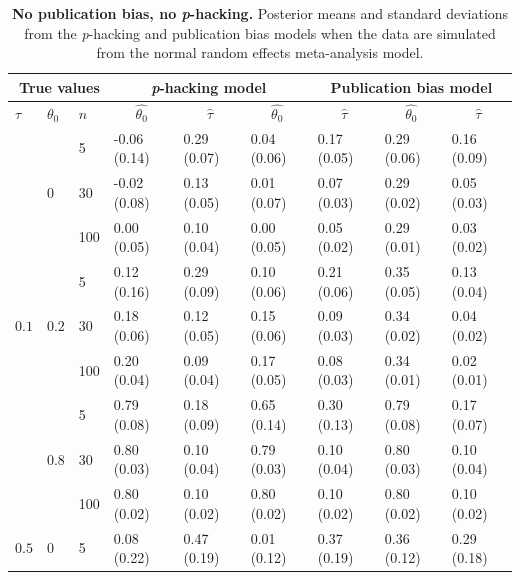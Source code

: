 \documentclass{article}
\theoremstyle{plain}
\theoremstyle{definition}
\begin{document}
\begin{table}[ht]
\centering
\caption{{\bf No publication bias, no \textit{p}-hacking.} Posterior means and standard deviations from the \textit{p}-hacking and publication bias models when the data are simulated from the normal random effects meta-analysis model.} 
\label{tab:Simulation_classical}
\begin{tabular}{lllllllll}
  \hline
  \multicolumn{3}{r}{\textbf{True values}} & 
       \multicolumn{3}{c}{\textbf{\textit{p}-hacking model}} &
       \multicolumn{3}{c}{\textbf{Publication bias model}} \\ \hline
$\tau$ & $\theta_0$ & $n$ & \multicolumn{1}{c}{$\widehat{\theta_0}$} & \multicolumn{1}{c}{$\widehat{\tau}$} & \multicolumn{1}{c}{$\widehat{\theta_0}$} & \multicolumn{1}{c}{$\widehat{\tau}$} & \multicolumn{1}{c}{$\widehat{\theta_0}$} & \multicolumn{1}{c}{$\widehat{\tau}$} \\ 
  \multirow{9}{*}{$0.1$} & \multirow{3}{*}{$0$} & 5 & -0.06 (0.14) & 0.29 (0.07) & 0.04 (0.06) & 0.17 (0.05) & 0.29 (0.06) & 0.16 (0.09) \\ 
   &  & 30 & -0.02 (0.08) & 0.13 (0.05) & 0.01 (0.07) & 0.07 (0.03) & 0.29 (0.02) & 0.05 (0.03) \\ 
   &  & 100 & 0.00 (0.05) & 0.10 (0.04) & 0.00 (0.05) & 0.05 (0.02) & 0.29 (0.01) & 0.03 (0.02) \\ 
   & \multirow{3}{*}{$0.2$} & 5 & 0.12 (0.16) & 0.29 (0.09) & 0.10 (0.06) & 0.21 (0.06) & 0.35 (0.05) & 0.13 (0.04) \\ 
   &  & 30 & 0.18 (0.06) & 0.12 (0.05) & 0.15 (0.06) & 0.09 (0.03) & 0.34 (0.02) & 0.04 (0.02) \\ 
   &  & 100 & 0.20 (0.04) & 0.09 (0.04) & 0.17 (0.05) & 0.08 (0.03) & 0.34 (0.01) & 0.02 (0.01) \\ 
   & \multirow{3}{*}{$0.8$} & 5 & 0.79 (0.08) & 0.18 (0.09) & 0.65 (0.14) & 0.30 (0.13) & 0.79 (0.08) & 0.17 (0.07) \\ 
   &  & 30 & 0.80 (0.03) & 0.10 (0.04) & 0.79 (0.03) & 0.10 (0.04) & 0.80 (0.03) & 0.10 (0.04) \\ 
   &  & 100 & 0.80 (0.02) & 0.10 (0.02) & 0.80 (0.02) & 0.10 (0.02) & 0.80 (0.02) & 0.10 (0.02) \\ 
  \multirow{9}{*}{$0.5$} & \multirow{3}{*}{$0$} & 5 & 0.08 (0.22) & 0.47 (0.19) & 0.01 (0.12) & 0.37 (0.19) & 0.36 (0.12) & 0.29 (0.18) \\ 

\end{tabular}
\end{table}
\end{document}
